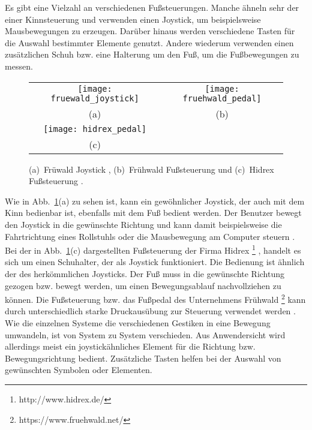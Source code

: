 Es gibt eine Vielzahl an verschiedenen Fußsteuerungen. Manche ähneln sehr der einer Kinnsteuerung und verwenden einen Joystick, um beispielsweise Mausbewegungen zu erzeugen. Darüber hinaus werden verschiedene Tasten für die Auswahl bestimmter Elemente genutzt. Andere wiederum verwenden einen zusätzlichen Schuh bzw. eine Halterung um den Fuß, um die Fußbewegungen zu messen.
%
%
\begin{figure}
\centering\small
\setlength{\tabcolsep}{0mm}	%
\begin{tabular}{c@{\hspace{0mm}}c} %
  \texttt{[image: fruewald\_joystick]} &
  \texttt{[image: fruehwald\_pedal]}
\\
  (a) & (b)
\\[7pt]	%
  \texttt{[image: hidrex\_pedal]}
\\
  (c)
\end{tabular}
%
\caption{(a)~Früwald Joystick \cite{FRUEHWALD}, (b)~Frühwald Fußsteuerung \cite{FRUEHWALD} und (c)~Hidrex Fußsteuerung \cite{HIDREX}.}
\label{fig:foot}
\end{figure}
%
%
\newline
Wie in Abb.~\ref{fig:foot}(a) zu sehen ist, kann ein gewöhnlicher Joystick, der auch mit dem Kinn bedienbar ist, ebenfalls mit dem Fuß bedient werden. Der Benutzer bewegt den Joystick in die gewünschte Richtung und kann damit beispielsweise die Fahrtrichtung eines Rollstuhls oder die Mausbewegung am Computer steuern \cite{FRUEHWALD}. 
\newline
Bei der in Abb.~\ref{fig:foot}(c) dargestellten Fußsteuerung der Firma Hidrex %
\footnote{http://www.hidrex.de/}%
, handelt es sich um einen Schuhalter, der als Joystick funktioniert. Die Bedienung ist ähnlich der des herkömmlichen Joysticks. Der Fuß muss in die gewünschte Richtung gezogen bzw. bewegt werden, um einen Bewegungsablauf nachvollziehen zu können.
Die Fußsteuerung bzw. das Fußpedal des Unternehmens Frühwald%
\footnote{https://www.fruehwald.net/}
%
kann durch unterschiedlich starke Druckausübung zur Steuerung verwendet werden \cite{FRUEHWALD}. 
%
\newline \newline
Wie die einzelnen Systeme die verschiedenen Gestiken in eine Bewegung umwandeln, ist von System zu System verschieden. Aus Anwendersicht wird allerdings meist ein joystickähnliches Element für die Richtung bzw. Bewegungsrichtung bedient. Zusätzliche Tasten helfen bei der Auswahl von gewünschten Symbolen oder Elementen.

